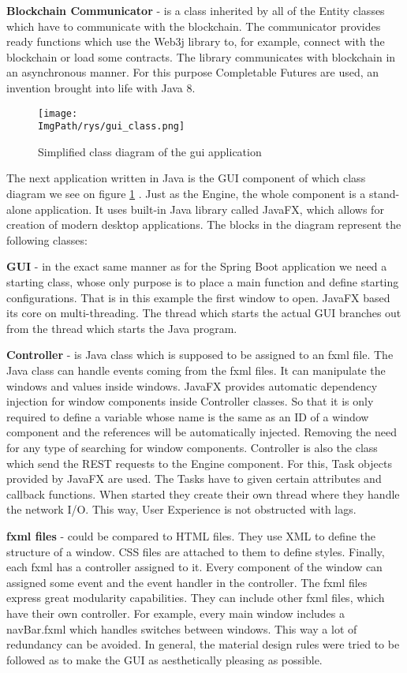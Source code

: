 \documentclass[a4paper,12pt,twoside,openany]{report}
\newcommand{\ImgPath}{.}
\begin{document}
\textbf{Blockchain Communicator} - is a class inherited by all of the Entity classes which have to communicate with the blockchain. The communicator provides ready functions which use the Web3j library to, for example, connect with the blockchain or load some contracts. The library communicates with blockchain in an asynchronous manner. For this purpose Completable Futures are used, an invention brought into life with Java 8.

\begin{figure}[!htbp]
	\begin{center}
\centering
\texttt{[image: \\ImgPath/rys/gui\_class.png]}
\end{center}
	\caption{Simplified class diagram of the gui application}
	\label{gui class}
\end{figure}

The next application written in Java is the GUI component of which class diagram we see on figure \ref{gui class} . Just as the Engine, the whole component is a stand-alone application. It uses built-in Java library called JavaFX, which allows for creation of modern desktop applications. The blocks in the diagram represent the following classes:

\textbf{GUI} - in the exact same manner as for the Spring Boot application we need a starting class, whose only purpose is to place a main function and define starting configurations. That is in this example the first window to open. JavaFX based its core on multi-threading. The thread which starts the actual GUI branches out from the thread which starts the Java program.

\textbf{Controller} - is Java class which is supposed to be assigned to an fxml file. The Java class can handle events coming from the fxml files. It can manipulate the windows and values inside windows. JavaFX provides automatic dependency injection for window components inside Controller classes. So that it is only required to define a variable whose name is the same as an ID of a window component and the references will be automatically injected. Removing the need for any type of searching for window components. Controller is also the class which send the REST requests to the Engine component. For this, Task objects provided by JavaFX are used. The Tasks have to given certain attributes and callback functions. When started they create their own thread where they handle the network I/O. This way, User Experience is not obstructed with lags.

\textbf{fxml files} - could be compared to HTML files. They use XML to define the structure of a window. CSS files are attached to them to define styles. Finally, each fxml has a controller assigned to it. Every component of the window can assigned some event and the event handler in the controller. The fxml files express great modularity capabilities. They can include other fxml files, which have their own controller. For example, every main window includes a navBar.fxml which handles switches between windows. This way a lot of redundancy can be avoided. In general, the material design rules were tried to be followed as to make the GUI as aesthetically pleasing as possible.
\end{document}
